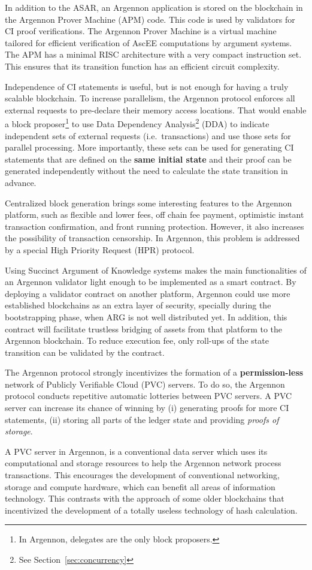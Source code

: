 In addition to the ASAR, an Argennon application is stored on the blockchain in the Argennon Prover Machine (APM) code.
This code is used by validators for CI proof verifications. The Argennon Prover Machine is a virtual
machine tailored for efficient verification of AscEE computations by
argument systems. The APM has a minimal RISC architecture with a very compact instruction set. This ensures that
its transition function has an efficient circuit complexity.

Independence of CI statements is useful, but is not enough for having a truly scalable blockchain. To increase
parallelism, the Argennon protocol enforces all external requests to pre-declare their memory access locations. That
would enable a block proposer\footnote{In Argennon, delegates are the only block proposers.} to use Data Dependency
Analysis\footnote{See Section~\ref{sec:concurrency}} (DDA) to indicate independent sets of external requests (i.e.\
transactions) and use those sets for parallel processing. More importantly, these sets can be used for generating CI
statements that are defined on the \textbf{same initial state} and their proof can be generated independently without
the need to calculate the state transition in advance.

Centralized block generation brings some interesting features to the Argennon platform, such as flexible and lower
fees, off chain fee payment, optimistic instant transaction confirmation, and front running protection.
However, it also increases the possibility of transaction censorship. In Argennon, this problem is addressed by a
special High Priority Request (HPR) protocol.

Using Succinct Argument of Knowledge systems makes the main functionalities of an Argennon validator light enough to
be implemented as a smart contract. By deploying a validator contract on another platform, Argennon
could use more established blockchains as an extra layer of security, specially
during the bootstrapping phase, when ARG is not well distributed yet. In addition, this contract will facilitate
trustless bridging of assets from that platform to the Argennon blockchain. To reduce execution fee, only
roll-ups of the state transition can be validated by the contract.

The Argennon protocol strongly incentivizes the formation of a \textbf{permission-less} network of Publicly Verifiable
Cloud (PVC) servers. To do so, the Argennon protocol conducts repetitive automatic lotteries between PVC servers.
A PVC server can increase its chance of winning by (i) generating proofs for more CI statements, (ii) storing all
parts of the ledger state and providing \emph{proofs of storage}.

A PVC server in Argennon, is a conventional data server which uses its computational and
storage resources to help the Argennon network process transactions. This encourages the development
of conventional networking, storage and compute hardware, which can benefit all areas of information technology.
This contrasts with the approach of some older blockchains that incentivized the development of a totally
useless technology of hash calculation.
